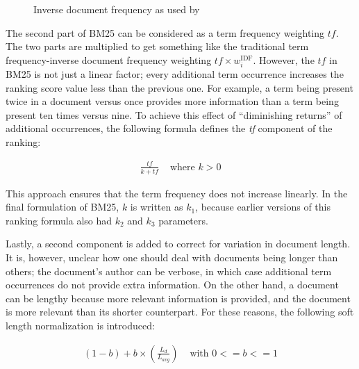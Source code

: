 \begin{figure}
	\caption{Inverse document frequency as used by \citet{bm25-robertson}}
	\label{idf}
\end{figure} 

The second part of BM25 can be considered as a term frequency weighting $\mathit{tf}$. The two parts are multiplied to get something like the traditional term frequency-inverse document frequency weighting $\mathit{tf} \times w_i^{\text{IDF}}$.
However, the $\mathit{tf}$ in BM25 is not just a linear factor; every additional term occurrence increases the ranking score value less than the previous one. For example, a term being present twice in a document versus once provides more information than a term being present ten times versus nine. To achieve this effect of ``diminishing returns'' of additional occurrences, the following formula defines the \textit{tf} component of the ranking:

\begin{align}
	\frac{\mathit{tf}}{k+\mathit{tf}} & \text{ where } k>0
\end{align}

This approach ensures that the term frequency does not increase linearly. In the final formulation of BM25, $k$ is written as $k_1$, because earlier versions of this ranking formula also had $k_2$ and $k_3$ parameters.

Lastly, a second component is added to correct for variation in document length. It is, however, unclear how one should deal with documents being longer than others; the document's author can be verbose, in which case additional term occurrences do not provide extra information. On the other hand, a document can be lengthy because more relevant information is provided, and the document is more relevant than its shorter counterpart. For these reasons, the following soft length normalization is introduced:

\begin{align}
	\left(1-b\right) + b \times \left(\frac{L_d}{L_{\mathit{avg}}}\right) & \text{ with } 0 <= b <= 1
\end{align}

